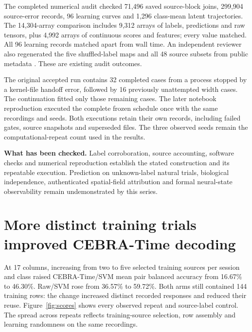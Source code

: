 \documentclass[10pt,a4paper]{article}
\newcommand{\key}[1]{\vspace{3pt}\noindent\colorbox{wash}{\parbox{\dimexpr\linewidth-2\fboxsep\relax}{\small #1}}\vspace{3pt}}
\begin{document}
The completed numerical audit checked 71,496 saved source-block joins, 299,904 source-error records, 96 learning curves and 1,296 class-mean latent trajectories. The 14,304-array comparison includes 9,312 arrays of labels, predictions and raw tensors, plus 4,992 arrays of continuous scores and features; every value matched. All 96 learning records matched apart from wall time. An independent reviewer also regenerated the five shuffled-label maps and all 48 source subsets from public metadata \cite{reproduction}. These are existing audit outcomes.

The original accepted run contains 32 completed cases from a process stopped by a kernel-file handoff error, followed by 16 previously unattempted width cases. The continuation fitted only those remaining cases. The later notebook reproduction executed the complete frozen schedule once with the same recordings and seeds. Both executions retain their own records, including failed gates, source snapshots and superseded files. The three observed seeds remain the computational-repeat count used in the results.

\key{\textbf{What has been checked.} Label corroboration, source accounting, software checks and numerical reproduction establish the stated construction and its repeatable execution. Prediction on unknown-label natural trials, biological independence, authenticated spatial-field attribution and formal neural-state observability remain undemonstrated by this series.}

\clearpage
\section{More distinct training trials improved CEBRA-Time decoding}
At 17 columns, increasing from two to five selected training sources per session and class raised CEBRA-Time/SVM mean pair balanced accuracy from 16.67\% to 46.30\%. Raw/SVM rose from 36.57\% to 59.72\%. Both arms still contained 144 training rows: the change increased distinct recorded responses and reduced their reuse. Figure~\ref{fig:scores} shows every observed repeat and source-label control. The spread across repeats reflects training-source selection, row assembly and learning randomness on the same recordings.
\end{document}
